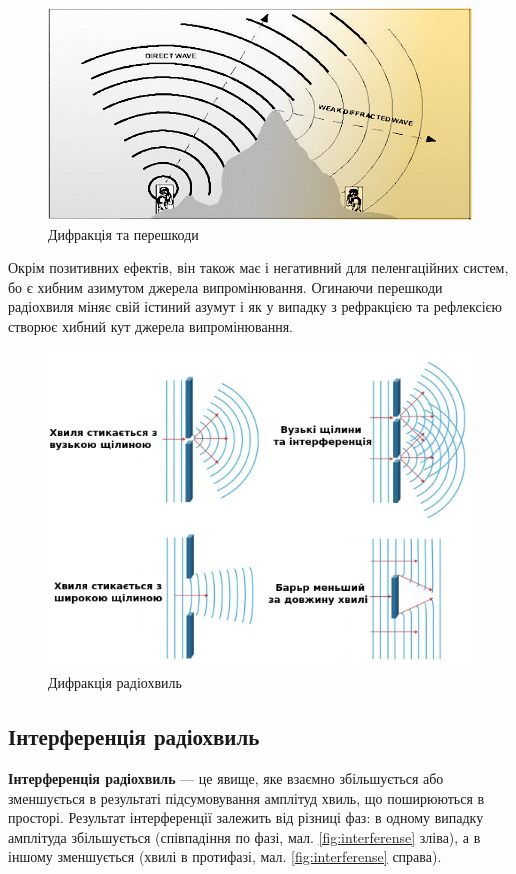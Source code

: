 \documentclass{article}
\begin{document}
\begin{figure}[h!]
	\centering
	\includegraphics[width=0.8\linewidth]{images/diffraction.png}
	\caption{\label{fig:diffraction}Дифракція та перешкоди}
\end{figure}

Окрім позитивних ефектів, він також має і негативний для пеленгаційних систем, бо є хибним азимутом джерела випромінювання. Огинаючи перешкоди радіохвиля міняє свій істиний азумут і як у випадку з рефракцією та рефлексією створює хибний кут джерела випромінювання. 
\begin{figure}[h!]
	\centering
	\includegraphics[width=0.6\linewidth]{images/diffraction_all.png}
	\caption{\label{fig:diffraction_all} Дифракція радіохвиль}
\end{figure}

\subsection{Інтерференція радіохвиль}

\textbf{Інтерференція радіохвиль} --- це явище, яке взаємно збільшується або зменшується в результаті підсумовування амплітуд хвиль, що поширюються в просторі. Результат інтерференції залежить від різниці фаз: в одному випадку амплітуда збільшується (співпадіння по фазі, мал. \ref{fig:interferense} зліва), а в іншому зменшується (хвилі в протифазі, мал. \ref{fig:interferense} справа).
\end{document}
